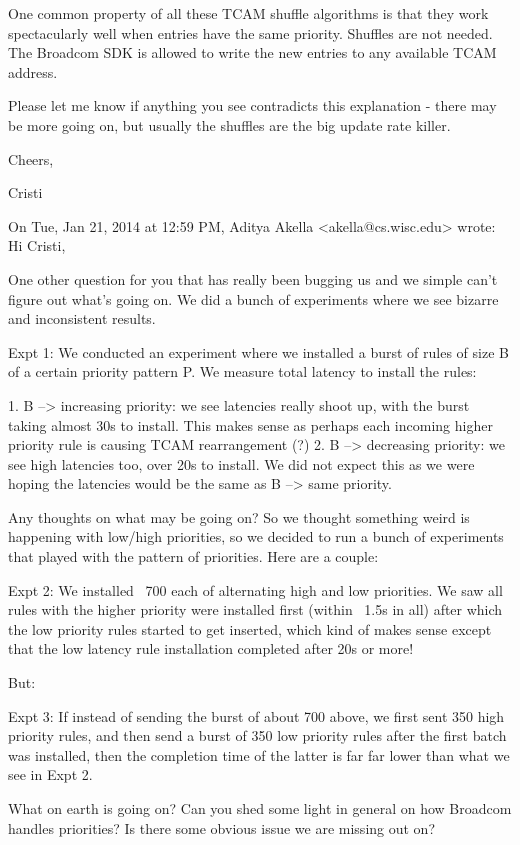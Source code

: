 One common property of all these TCAM shuffle algorithms is that they work
spectacularly well when entries have the same priority. Shuffles are not
needed. The Broadcom SDK is allowed to write the new entries to any available
TCAM address. 

Please let me know if anything you see contradicts this explanation - there may
be more going on, but usually the shuffles are the big update rate killer. 

Cheers,

Cristi



On Tue, Jan 21, 2014 at 12:59 PM, Aditya Akella <akella@cs.wisc.edu> wrote:
Hi Cristi,

One other question for you that has really been bugging us and we simple can't figure out what's going on. We did a bunch of experiments where we see bizarre and inconsistent results.

Expt 1: We conducted an experiment where we installed a burst of rules of size B of a certain priority pattern P. We measure total latency to install the rules:

1. B --> increasing priority: we see latencies really shoot up, with the burst taking almost 30s to install. This makes sense as perhaps each incoming higher priority rule is causing TCAM rearrangement (?)
2. B --> decreasing priority: we see high latencies too, over 20s to install. We did not expect this as we were hoping the latencies would be the same as B --> same priority.

Any thoughts on what may be going on? So we thought something weird is happening with low/high priorities, so we decided to run a bunch of experiments that played with the pattern of priorities. Here are a couple:

Expt 2: We installed ~700 each of alternating high and low priorities. We saw all rules with the higher priority were installed first (within ~1.5s in all) after which the low priority rules started to get inserted, which kind of makes sense except that the  low latency rule installation completed after 20s or more!

But:

Expt 3: If instead of sending the burst of about 700 above, we first sent 350 high priority rules, and then send a burst of 350 low priority rules after the first batch was installed, then the completion time of the latter is far far lower than what we see in Expt 2.

What on earth is going on? Can you shed some light in general on how Broadcom handles priorities? Is there some obvious issue we are missing out on?

\fi
